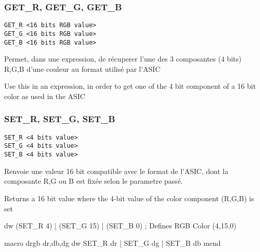 \subsubsection{GET\_R, GET\_G, GET\_B}

\begin{verbatim}
GET_R <16 bits RGB value>
GET_G <16 bits RGB value>
GET_B <16 bits RGB value>
\end{verbatim}

\begin{xfr}
Permet, dans une expression, de récuperer l'une des 3 composantes (4 bits) R,G,B d'une couleur au format utilisé par l'ASIC
\end{xfr}

\begin{xen}
Use this in an expression, in order to get one of the 4 bit component of a 16 bit color as used in the ASIC
\end{xen}

\subsubsection{SET\_R, SET\_G, SET\_B}
\begin{verbatim}
SET_R <4 bits value>
SET_G <4 bits value>
SET_B <4 bits value>
\end{verbatim}

\begin{xfr}
Renvoie une valeur 16 bit compatible avec le format de l'ASIC, dont la composante R,G ou B est fixée selon le parametre passé.
\end{xfr}

\begin{xen}
Returns a 16 bit value where the 4-bit value of the color component (R,G,B) is set
\end{xen}

\begin{code}
  dw (SET\_R 4) | (SET\_G 15) | (SET\_B 0) ; Defines RGB Color  (4,15,0)
\end{code}
\begin{code}
  macro drgb dr,db,dg
  dw SET\_R {dr} | SET\_G {dg} | SET\_B {db}
  mend
\end{code}


\subsection{}

